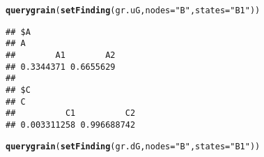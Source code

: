\documentclass[10pt]{article}\usepackage[]{graphicx}\usepackage[]{color}
\makeatletter
\newcommand{\hlstr}[1]{\textcolor[rgb]{0.192,0.494,0.8}{#1}}%
\newcommand{\hlstd}[1]{\textcolor[rgb]{0.345,0.345,0.345}{#1}}%
\newcommand{\hlkwc}[1]{\textcolor[rgb]{0.333,0.667,0.333}{#1}}%
\newcommand{\hlkwd}[1]{\textcolor[rgb]{0.737,0.353,0.396}{\textbf{#1}}}%
\newenvironment{kframe}{%
 \def\at@end@of@kframe{}%
 \ifinner\ifhmode%
  \def\at@end@of@kframe{\end{minipage}}%
  \begin{minipage}{\columnwidth}%
 \fi\fi%
 \def\FrameCommand##1{\hskip\@totalleftmargin \hskip-\fboxsep
 \colorbox{shadecolor}{##1}\hskip-\fboxsep
     \hskip-\linewidth \hskip-\@totalleftmargin \hskip\columnwidth}%
 \MakeFramed {\advance\hsize-\width
   \@totalleftmargin\z@ \linewidth\hsize
   \@setminipage}}%
 {\par\unskip\endMakeFramed%
 \at@end@of@kframe}
\newenvironment{knitrout}{}{} %
\makeatother
\begin{document}
\begin{knitrout}
\color{fgcolor}\begin{kframe}
\begin{alltt}
\hlkwd{querygrain}\hlstd{(}\hlkwd{setFinding}\hlstd{(gr.uG,} \hlkwc{nodes}\hlstd{=}\hlstr{"B"}\hlstd{,} \hlkwc{states}\hlstd{=}\hlstr{"B1"}\hlstd{))}
\end{alltt}
\begin{verbatim}
## $A
## A
##        A1        A2 
## 0.3344371 0.6655629 
## 
## $C
## C
##          C1          C2 
## 0.003311258 0.996688742
\end{verbatim}
\begin{alltt}
\hlkwd{querygrain}\hlstd{(}\hlkwd{setFinding}\hlstd{(gr.dG,} \hlkwc{nodes}\hlstd{=}\hlstr{"B"}\hlstd{,} \hlkwc{states}\hlstd{=}\hlstr{"B1"}\hlstd{))}
\end{alltt}


{\ttfamily\noindent\bfseries{}}\end{kframe}
\end{knitrout}



\end{document}
